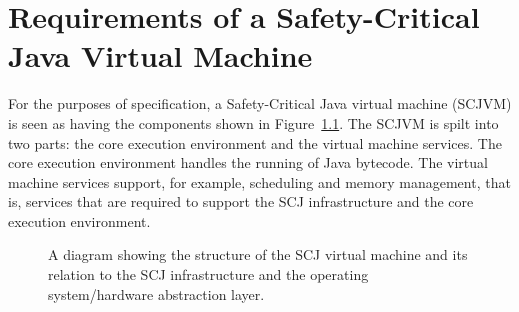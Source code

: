\documentclass[a4paper,10pt]{report}
\begin{document}
\chapter{Requirements of a Safety-Critical Java Virtual Machine}
\label{requirements-chapter}

For the purposes of specification, a Safety-Critical Java virtual machine
(SCJVM) is seen as having the components shown in Figure~\ref{scjvm-fig}. The
SCJVM is spilt into two parts: the core execution environment and the virtual
machine services. The core execution environment handles the running of Java
bytecode.  The virtual machine services support, for example, scheduling and
memory management, that is, services that are required to support the SCJ
infrastructure and the core execution environment.

\begin{figure}[ht]
  \centering
  \caption{A diagram showing the structure of the SCJ virtual machine and its
    relation to the SCJ infrastructure and the operating system/hardware
    abstraction layer.}
  \label{scjvm-fig}
\end{figure}
\end{document}
